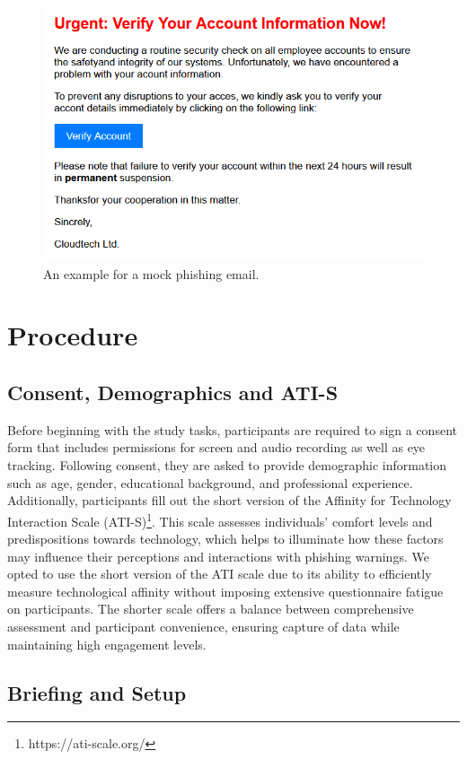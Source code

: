 \documentclass[
  a4paper,  %
  twoside,  %
  bibliography=totoc,
  headsepline,
  cleardoublepage=empty,
  parskip=half,
  draft=false
]{scrbook}
\begin{document}
\begin{figure} [ht]
    \centering
    \includegraphics[width=0.6\linewidth]{figures/example.png}
    \caption{An example for a mock phishing email.}
    \label{fig:example}
\end{figure}

\section{Procedure}

\subsection{Consent, Demographics and ATI-S}

Before beginning with the study tasks, participants are required to sign a consent form that includes permissions for screen and audio recording as well as eye tracking. Following consent, they are asked to provide demographic information such as age, gender, educational background, and professional experience. Additionally, participants fill out the short version of the Affinity for Technology Interaction Scale (ATI-S)\footnote{https://ati-scale.org/}. This scale assesses individuals' comfort levels and predispositions towards technology, which helps to illuminate how these factors may influence their perceptions and interactions with phishing warnings. \newline
We opted to use the short version of the ATI scale due to its ability to efficiently measure technological affinity without imposing extensive questionnaire fatigue on participants. The shorter scale offers a balance between comprehensive assessment and participant convenience, ensuring capture of data while maintaining high engagement levels. 

\subsection{Briefing and Setup}
\end{document}
